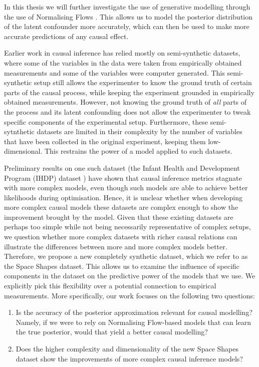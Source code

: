 \documentclass{report}
\begin{document}

In this thesis we will further investigate the use of generative modelling through the use of Normalising Flows \parencite{rezende2016variational}. This allows us to model the posterior distribution of the latent confounder more accurately, which can then be used to make more accurate predictions of any causal effect.


Earlier work in causal inference has relied mostly on semi-synthetic datasets, where some of the variables in the data were taken from empirically obtained measurements and some of the variables were computer generated. This semi-synthetic setup still allows the experimenter to know the ground truth of certain parts of the causal process, while keeping the experiment grounded in empirically obtained measurements. However, not knowing the ground truth of \textit{all} parts of the process and its latent confounding does not allow the experimenter to tweak specific components of the experimental setup. Furthermore, these semi-sytnthetic datasets are limited in their complexity by the number of variables that have been collected in the original experiment, keeping them low-dimensional. This restrains the power of a model applied to such datasets.

Preliminary results on one such dataset (the Infant Health and Development Program (IHDP) dataset \parencite{hill2011bayesian}) have shown that causal inference metrics stagnate with more complex models, even though such models are able to achieve better likelihoods during optimisation. Hence, it is unclear whether when developing more complex causal models these datasets are complex enough to show the improvement brought by the model. Given that these existing datasets are perhaps too simple while not being necessarily representative of complex setups, we question whether more complex datasets with richer causal relations can illustrate the differences between more and more complex models better. Therefore, we propose a new completely synthetic dataset, which we refer to as the Space Shapes dataset. This allows us to examine the influence of specific components in the dataset on the predictive power of the models that we use. We explicitly pick this flexibility over a potential connection to empirical measurements.
More specifically, our work focuses on the following two questions: 
\begin{enumerate}
    \item Is the accuracy of the posterior approximation relevant for causal modelling? Namely, if we were to rely on Normalising Flow-based models that can learn the true posterior, would that yield a better causal modelling? 
    \item Does the higher complexity and dimensionality of the new Space Shapes dataset show the improvements of more complex causal inference models?
\end{enumerate} 
\end{document}
